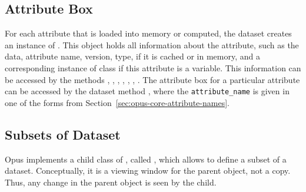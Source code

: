 \subsection{Attribute Box}
\label{sec:attribute-box}
%
For each attribute \attributesindex that is loaded into memory or computed, the dataset \datasetindex creates
an instance of . \attributesindex This object holds all information
about the attribute, \attributesindex such as the data, attribute \attributesindex name, 
version, type, if it is cached or in memory, and a corresponding
instance of class  \variablesindex if this attribute \attributesindex is a variable. \variablesindex This
information can be accessed by the  \attributesindex methods
, , \variablesindex {},
, , ,
. \variablesindex The attribute \attributesindex box for a particular attribute \attributesindex
can be accessed by the dataset \datasetindex method
, \attributesindex where the \verb|attribute_name| \attributesindex is
given in one of the  forms from Section~\ref{sec:opus-core-attribute-names}.

\subsection{Subsets of Dataset}
\datasetindex\datasetsubsetindex
%
Opus implements a child class of , \datasetindex called , \datasetsubsetindex
which allows to define a subset of a dataset. \datasetindex\datasetsubsetindex Conceptually, it is a viewing
window for the parent  \datasetindex object, not a copy. Thus, any change in
the parent object is seen by the child.

